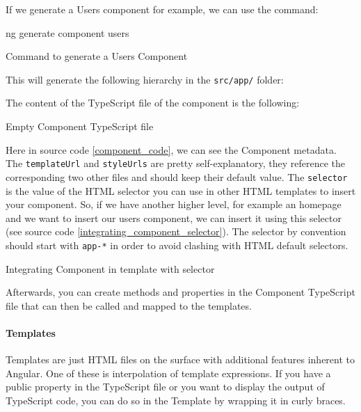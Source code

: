 \documentclass[twoside, openright,11pt,a4paper]{book}
\newenvironment{code}{\captionsetup{type=listing}}{}
\begin{document}
If we generate a Users component for example, we can use the command:
\begin{code}
	\begin{shell}
ng generate component users
	\end{shell}
	\caption{Command to generate a Users Component}
\end{code}
This will generate the following hierarchy in the \verb+src/app/+ folder:

The content of the TypeScript file of the component is the following:
\begin{code}
	\caption{Empty Component TypeScript file}
	\label{component_code}
\end{code}

Here in source code \ref{component_code}, we can see the Component metadata. The \verb+templateUrl+ and \verb+styleUrls+ are pretty self-explanatory, they reference the corresponding two other files and should keep their default value. The \verb+selector+ is the value of the HTML selector you can use in other HTML templates to insert your component. So, if we have another higher level, for example an homepage and we want to insert our users component, we can insert it using this selector (see source code \ref{integrating_component_selector}). The selector by convention should start with \verb+app-*+ in order to avoid clashing with HTML default selectors.
\begin{code}
	\caption{Integrating Component in template with selector}
	\label{integrating_component_selector}
\end{code}

Afterwards, you can create methods and properties in the Component TypeScript file that can then be called and mapped to the templates. 
\paragraph{Templates}
Templates\cite{angular:doc:templates} are just HTML files on the surface with additional features inherent to Angular. One of these is interpolation of template expressions. If you have a public property in the TypeScript file or you want to display the output of TypeScript code, you can do so in the Template by wrapping it in curly braces.
\end{document}

